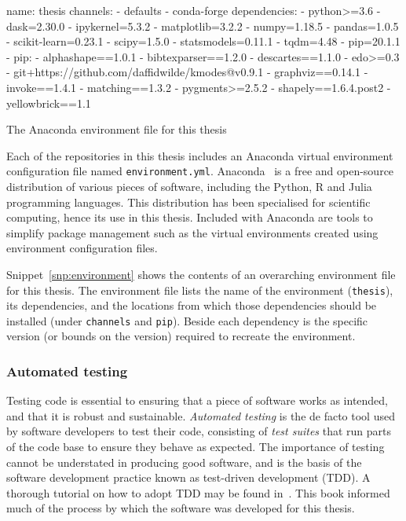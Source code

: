 \begin{listing}[htbp]
\begin{sourceyml}
name: thesis
channels:
- defaults
- conda-forge
dependencies:
 - python>=3.6
 - dask=2.30.0
 - ipykernel=5.3.2
 - matplotlib=3.2.2
 - numpy=1.18.5
 - pandas=1.0.5
 - scikit-learn=0.23.1
 - scipy=1.5.0
 - statsmodels=0.11.1
 - tqdm=4.48
 - pip=20.1.1
 - pip:
   - alphashape==1.0.1
   - bibtexparser==1.2.0
   - descartes==1.1.0
   - edo>=0.3
   - git+https://github.com/daffidwilde/kmodes@v0.9.1
   - graphviz==0.14.1
   - invoke==1.4.1
   - matching==1.3.2
   - pygments>=2.5.2
   - shapely==1.6.4.post2
   - yellowbrick==1.1
\end{sourceyml}
\caption{The Anaconda environment file for this thesis}\label{snp:environment}
\end{listing}

Each of the repositories in this thesis includes an Anaconda virtual environment
configuration file named \texttt{environment.yml}.
Anaconda~\cite{anaconda} is a free and open-source distribution of various
pieces of software, including the Python, R and Julia programming languages.
This distribution has been specialised for scientific computing, hence its use
in this thesis. Included with Anaconda are tools to simplify package management
such as the virtual environments created using environment configuration files.

Snippet~\ref{snp:environment} shows the contents of an overarching environment
file for this thesis. The environment file lists the name of the environment
(\texttt{thesis}), its dependencies, and the locations from which
those dependencies should be installed (under \texttt{channels} and
\texttt{pip}). Beside each dependency is the specific version (or
bounds on the version) required to recreate the environment.

\subsubsection{Automated testing}

Testing code is essential to ensuring that a piece of software works as
intended, and that it is robust and sustainable. \emph{Automated testing} is the
de facto tool used by software developers to test their code, consisting of
\emph{test suites} that run parts of the code base to ensure they behave as
expected. The importance of testing cannot be understated in producing good
software, and is the basis of the software development practice known as
test-driven development (TDD). A thorough tutorial on how to adopt TDD may be
found in~\cite{Percival2017}. This book informed much of the process by which
the software was developed for this thesis. 

